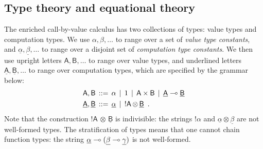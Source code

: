\documentclass{LMCS}
\newcommand{\comptype}[1]{\underline{#1}}
\newcommand{\VconstA}{\alpha}
\newcommand{\VconstB}{\beta}
\newcommand{\CconstA}{\comptype{\alpha}}
\newcommand{\CconstB}{\comptype{\beta}}
\newcommand{\CconstC}{\comptype{\gamma}}
\newcommand{\VA}{\mathsf{A}}
\newcommand{\VB}{\mathsf{B}}
\newcommand{\CA}{\comptype{\mathsf{A}}}
\newcommand{\CB}{\comptype{\mathsf{B}}}
\newcommand{\tensor}{\otimes}
\newcommand{\ltensortype}[2]{{!} #1 \, {\tensor} \, #2}
\newcommand{\prodtype}{\times}
\begin{document}
\subsection{Type theory and equational theory}
\label{sec:ecbvsyntax}
The enriched call-by-value calculus has two collections of types:
value types and computation types.  We use $\VconstA, \VconstB, \dots$
to range over a set of \emph{value type constants}, and
$\CconstA,\CconstB,\dots$ to range over a disjoint set of
\emph{computation type constants}.  We then use 
upright letters $\VA,\VB,\dots$ to
range over value types, and underlined letters 
$\CA,\CB,\dots$ to range over
computation types, which are specified by the grammar below:
\begin{align*}
\VA,\VB \, & ::= \, \VconstA \,\mid \,\valone \,\mid \,\VA \prodtype \VB \, \mid\,  \CA \lpop \CB  \\
\CA,\CB \, & ::= \, \CconstA \,\mid  \,   \ltensortype{\VA}{\CB} \enspace .
\end{align*}
\noindent
Note that the construction $\ltensortype{\VA}{\CB}$ is indivisible:
the strings ${!}\VconstA$ and ${\CconstA\otimes \CconstB}$ 
are not well-formed types.
The stratification of types means that one cannot chain function 
types: the string $\CconstA\lpop(\CconstB\lpop \CconstC)$ is not well-formed.
\end{document}
